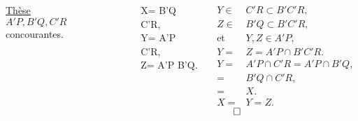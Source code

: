 \documentclass[10pt]{beamer}
\begin{document}
{\begin{columns}[t]
\begin{tcolorbox}[basic]
				    \underline{Thèse} \\
				    \smallskip
				    $A'P,B'Q,C'R$ concourantes.
				    \end{tcolorbox}
		
		
		\flushleft
		
		\bigskip 
		
		\begin{numcases}{}X= B'Q \cap C'R, \label{eq:1}\\
				  Y= A'P \cap C'R, \label{eq:2}\\
				  Z= A'P \cap B'Q. \label{eq:3} 
		\end{numcases} \medskip
		
		 
		\begin{align*}
		Y \in& C'R \subset B'C'R, \\
		Z \in& B'Q \subset B'C'R, \\
		\text{et }&  Y,Z \in A'P, \\[1em]				
			    Y =& Z  =A'P \cap B'C'R. \\[1.5em]		
			    Y =& A'P \cap C'R = A'P \cap B'Q, \\
			      =& B'Q \cap C'R, \\
			      =& X.\\[0.5em]
			    X =& Y = Z. 	      
		\end{align*}
		\hfill $\qed$
		

		
		
		
		
	
	   \end{columns}
       
       
       }
  
\end{document}
